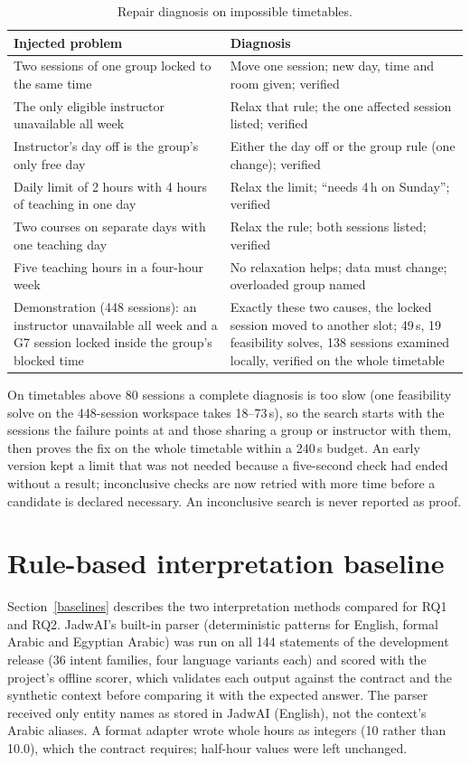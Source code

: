 \begin{table}[h]
\centering
\small
\begin{tabular}{@{}p{}p{}@{}}
\toprule
Injected problem & Diagnosis \\
\midrule
Two sessions of one group locked to the same time & Move one session; new day, time and room given; verified \\
The only eligible instructor unavailable all week & Relax that rule; the one affected session listed; verified \\
Instructor's day off is the group's only free day & Either the day off or the group rule (one change); verified \\
Daily limit of 2 hours with 4 hours of teaching in one day & Relax the limit; ``needs 4\,h on Sunday''; verified \\
Two courses on separate days with one teaching day & Relax the rule; both sessions listed; verified \\
Five teaching hours in a four-hour week & No relaxation helps; data must change; overloaded group named \\
\midrule
Demonstration (448 sessions): an instructor unavailable all week and a G7 session locked inside the group's blocked time & Exactly these two causes, the locked session moved to another slot; 49\,s, 19 feasibility solves, 138 sessions examined locally, verified on the whole timetable \\
\bottomrule
\end{tabular}
\caption{Repair diagnosis on impossible timetables.}
\label{tab:repair}
\end{table}

On timetables above 80 sessions a complete diagnosis is too slow (one feasibility solve on the 448-session workspace takes 18--73\,s), so the search starts with the sessions the failure points at and those sharing a group or instructor with them, then proves the fix on the whole timetable within a 240\,s budget. An early version kept a limit that was not needed because a five-second check had ended without a result; inconclusive checks are now retried with more time before a candidate is declared necessary. An inconclusive search is never reported as proof.

\section{Rule-based interpretation baseline}\label{evidence-baseline}
Section~\ref{baselines} describes the two interpretation methods compared for RQ1 and RQ2. JadwAI's built-in parser (deterministic patterns for English, formal Arabic and Egyptian Arabic) was run on all 144 statements of the development release (36 intent families, four language variants each) and scored with the project's offline scorer, which validates each output against the contract and the synthetic context before comparing it with the expected answer. The parser received only entity names as stored in JadwAI (English), not the context's Arabic aliases. A format adapter wrote whole hours as integers (10 rather than 10.0), which the contract requires; half-hour values were left unchanged.

